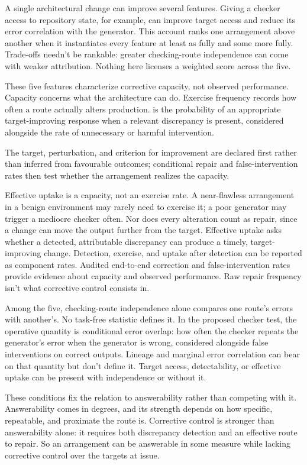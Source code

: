 \documentclass[12pt]{article}
\begin{document}
A single architectural change can improve several features. Giving a checker access to
repository state, for example, can improve target access and reduce its error correlation
with the generator. This account ranks one arrangement above another when it instantiates
every feature at least as fully and some more fully. Trade-offs needn't be rankable: greater
checking-route independence can come with weaker attribution. Nothing here licenses a
weighted score across the five.

These five features characterize corrective capacity, not observed performance. Capacity
concerns what the architecture can do. Exercise frequency records how often a route
actually alters production.  is the probability of an
appropriate target-improving response when a relevant discrepancy is present, considered
alongside the rate of unnecessary or harmful intervention.

The target, perturbation, and criterion for improvement are declared first rather than
inferred from favourable outcomes; conditional repair and false-intervention rates then
test whether the arrangement realizes the capacity.

Effective uptake is a capacity, not an exercise rate. A near-flawless arrangement in a
benign environment may rarely need to exercise it; a poor generator may trigger a mediocre
checker often. Nor does every alteration count as repair, since a change can move the
output further from the target. Effective uptake asks whether a detected,
attributable discrepancy can produce a timely, target-improving change. Detection,
exercise, and uptake after detection can be reported as component rates. Audited
end-to-end correction and false-intervention rates provide evidence about capacity and
observed performance. Raw repair frequency isn't what corrective control consists in.

Among the five, checking-route independence alone compares one route's errors with
another's. No task-free statistic defines it. In the proposed checker test, the operative
quantity is conditional error overlap: how often the checker repeats the generator's error
when the generator is wrong, considered alongside false interventions on correct outputs.
Lineage and marginal error correlation can bear on that quantity but don't define it.
Target access, detectability, or effective uptake can be present with independence or
without it.

These conditions fix the relation to answerability rather than competing with it.
Answerability comes in degrees, and its strength depends on how specific, repeatable, and
proximate the route is. Corrective control is stronger than answerability alone: it
requires both discrepancy detection and an effective route to repair. So an arrangement
can be answerable in some measure while lacking corrective control over the targets at
issue.
\end{document}
